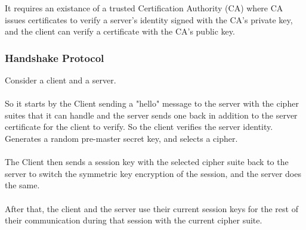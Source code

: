 \documentclass{article}
\begin{document}
It requires an existance of a trusted Certification Authority (CA) where CA issues certificates to verify a server's identity signed with the CA's private key, and the client can verify a certificate with the CA's public key.

\subsubsection{Handshake Protocol}

Consider a client and a server.
\\
\\
So it starts by the Client sending a "hello" message to the server with the cipher suites that it can handle and the server sends one back in addition to the server certificate for the client to verify. So the client verifies the server identity. Generates a random pre-master secret key, and selects a cipher.
\\
\\
The Client then sends a session key with the selected cipher suite back to the server to switch the symmetric key encryption of the session, and the server does the same.
\\
\\
After that, the client and the server use their current session keys for the rest of their communication during that session with the current cipher suite.
\end{document}
